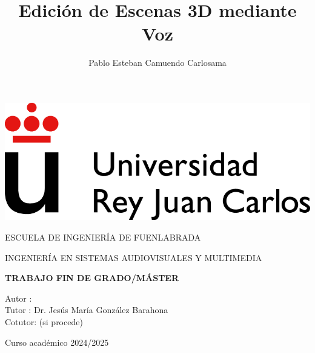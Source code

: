 \documentclass[a4paper, 12pt]{book}
\title{Edición de Escenas 3D mediante Voz}
\author{Pablo Esteban Camuendo Carlosama}
\makeatletter
\let\thetitle\@title
\let\theauthor\@author
\makeatother
\begin{document}
\renewcommand{\refname}{Bibliografía}  %
\renewcommand{\appendixname}{Apéndice}



\begin{titlepage}
\begin{center}
\includegraphics[scale=0.6]{img/URJ_logo_Color_POS.png}

\vspace{1.75cm}

\LARGE
ESCUELA DE INGENIERÍA DE FUENLABRADA
\vspace{1cm}

\LARGE
INGENIERÍA EN SISTEMAS AUDIOVISUALES Y MULTIMEDIA

\vspace{1cm}
\LARGE
\textbf{TRABAJO FIN DE GRADO/MÁSTER}

\vspace{2cm}

\Large
\MakeUppercase{\thetitle}

\vspace{2cm}

\large
Autor : \theauthor \\
Tutor : Dr. Jesús María González Barahona\\
Cotutor: (si procede)
\vspace{1cm}

\large
Curso académico 2024/2025

\end{center}
\end{titlepage}

\newpage
\mbox{}
\thispagestyle{empty} %



\clearpage
{}
\chapter*{}
\end{document}
